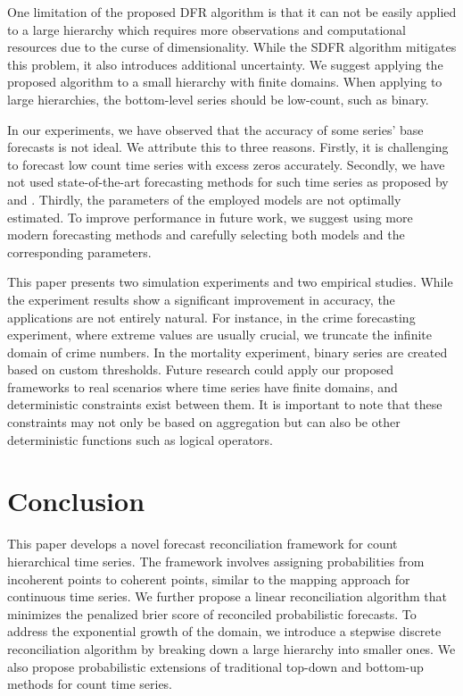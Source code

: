 \documentclass[a4paper,review,12pt,authoryear]{elsarticle}
\begin{document}
     One limitation of the proposed DFR algorithm is that it can not be easily applied to a large hierarchy which requires more observations and computational resources due to the curse of dimensionality.
     While the SDFR algorithm mitigates this problem, it also introduces additional uncertainty.
     We suggest applying the proposed algorithm to a small hierarchy with finite domains.
     When applying to large hierarchies, the bottom-level series should be low-count, such as binary.

     In our experiments, we have observed that the accuracy of some series' base forecasts is not ideal.
     We attribute this to three reasons. Firstly, it is challenging to forecast low count time series with excess zeros accurately.
     Secondly, we have not used state-of-the-art forecasting methods for such time series as proposed by \cite{berryBayesianForecastingMany2020a} and \cite{weissEfficientAccountingEstimation2022}.
     Thirdly, the parameters of the employed models are not optimally estimated.
     To improve performance in future work, we suggest using more modern forecasting methods and carefully selecting both models and the corresponding parameters.

     This paper presents two simulation experiments and two empirical studies.
     While the experiment results show a significant improvement in accuracy, the applications are not entirely natural.
     For instance, in the crime forecasting experiment, where extreme values are usually crucial, we truncate the infinite domain of crime numbers.
     In the mortality experiment, binary series are created based on custom thresholds.
     Future research could apply our proposed frameworks to real scenarios where time series have finite domains, and deterministic constraints exist between them.
     It is important to note that these constraints may not only be based on aggregation but can also be other deterministic functions such as logical operators.




     \section{Conclusion}
     \label{sec:conclusion}

     This paper develops a novel forecast reconciliation framework for count hierarchical time series.
     The framework involves assigning probabilities from incoherent points to coherent points, similar to the mapping approach for continuous time series.
     We further propose a linear reconciliation algorithm that minimizes the penalized brier score of reconciled probabilistic forecasts.
     To address the exponential growth of the domain, we introduce a stepwise discrete reconciliation algorithm by breaking down a large hierarchy into smaller ones.
     We also propose probabilistic extensions of traditional top-down and bottom-up methods for count time series.
\end{document}
